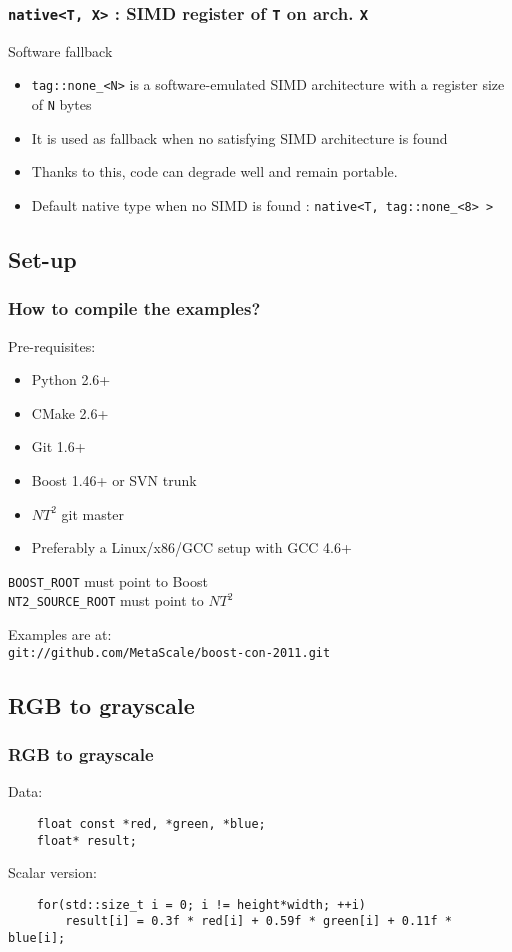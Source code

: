 \frame
{
\frametitle{\texttt{native<T, X>} : SIMD register of \texttt{T} on arch. \texttt{X}}
		
\begin{block}{Software fallback}
	\begin{itemize}\footnotesize
		\item \lstinline{tag::none_<N>} is a software-emulated SIMD architecture with a register size of \lstinline{N} bytes
		\item It is used as fallback when no satisfying SIMD architecture is found
		\item Thanks to this, code can degrade well and remain portable.
	\item Default native type when no SIMD is found : \lstinline{native<T, tag::none_<8> >}
	
	\end{itemize}
	\end{block}{}	
	}

\subsection{Set-up}
\frame
{
	\frametitle{How to compile the examples?}	
	
	Pre-requisites:
	\begin{itemize}
		\item Python 2.6+
		\item CMake 2.6+
		\item Git 1.6+
		\item Boost 1.46+ or SVN trunk
		\item $NT^2$ git master
		\item Preferably a Linux/x86/GCC setup with GCC 4.6+
	\end{itemize}
	\bigskip
	
	\texttt{BOOST\_ROOT} must point to Boost\\
	\texttt{NT2\_SOURCE\_ROOT} must point to $NT^2$
	\bigskip
	
	Examples are at:\\
	\texttt{git://github.com/MetaScale/boost-con-2011.git}
}

\subsection{RGB to grayscale}
\begin{frame}[fragile]
	\frametitle{RGB to grayscale}
	
	Data:\\
\bigskip
	\begin{lstlisting}
	float const *red, *green, *blue;
	float* result;
	\end{lstlisting}
	
\bigskip
	Scalar version:\\
\bigskip
	\begin{lstlisting}
	for(std::size_t i = 0; i != height*width; ++i)
	    result[i] = 0.3f * red[i] + 0.59f * green[i] + 0.11f * blue[i]; 
	\end{lstlisting}
	
\end{frame}

